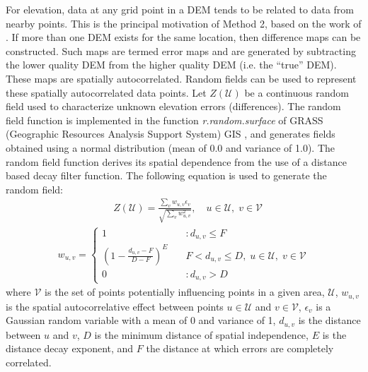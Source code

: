 \documentclass[12pt]{article}
\begin{document}
For elevation, data at any grid point in a DEM tends to be related to
data from nearby points.  This is the principal motivation of Method
2, based on the work of \citep{Ehlschlaeger_1994}. If more than one
DEM exists for the same location, then difference maps can be
constructed. Such maps are termed error maps
and are generated by subtracting the lower quality DEM from the higher quality DEM (i.e. the ``true'' DEM).
These maps are spatially autocorrelated.  Random fields can be used to 
represent these spatially autocorrelated data points.  Let $Z(\mathcal{U})$ be a
continuous random field used to characterize unknown elevation errors
(differences).
The random field function is implemented in the function
\textit{r.random.surface} \citep{Ehlschlaeger_1994} of GRASS (Geographic Resources Analysis Support System) GIS
\citep{Mitasova1996}, and generates fields obtained using a normal
distribution (mean of 0.0 and variance of 1.0). The random field
function derives its spatial dependence from the use of a distance
based decay filter function. The following equation is used to
generate the random field:
\begin{align}
  &Z(\mathcal{U})= \frac{\sum_v w_{u,v}\epsilon_v}{\sqrt{\sum_v
      w_{u,v}^2}}, \quad u\in \mathcal{U}, \; v \in \mathcal{V}
 \label{eqn1}
 \end{align}
 \begin{align}
   w_{u,v} = \left\{ \begin{array}{ll} 1 & \quad :d_{u,v} \le F \\
       \left(1- \frac{d_{u,v} - F}{D - F} \right)^E & \quad F <
       d_{u,v} \le D, \; u \in \mathcal{U}, \; v \in \mathcal{V}\\ 0 &
       \quad :d_{u,v} > D
\end{array} \right.
\label{eqn2}                                                    
\end{align}
where $\mathcal{V}$ is the set of points potentially influencing
points in a given area, $\mathcal{U}$, $w_{u,v}$ is the spatial
autocorrelative effect between points $u \in \mathcal{U}$ and $v \in
\mathcal{V}$, $\epsilon_v$ is a Gaussian random variable with a mean of 0 and
variance of 1, $d_{u,v}$ is the distance between $u$ and $v$, $D$ is
the minimum distance of spatial independence, $E$ is the distance
decay exponent, and $F$ the distance at which errors are completely
correlated.
\end{document}
